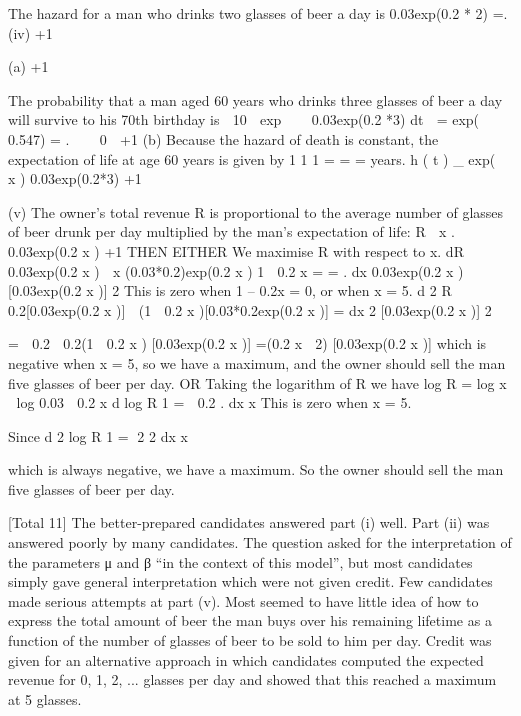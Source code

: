 \documentclass[a4paper,12pt]{article}
\begin{document}
The hazard for a man who drinks two glasses of beer a day is
0.03exp(0.2 * 2) \;=.
(iv)
+1

(a)
+1

The probability that a man aged 60 years who drinks three glasses of
beer a day will survive to his 70th birthday is
 10

exp    0.03exp(0.2 *3) dt  \;=\; exp(  0.547) \;= .


 0

+1
(b)
Because the hazard of death is constant, the expectation of life at age
60 years is given by
1
1
1
\;=\;
\;=\;
\;= years.
h ( t ) \mu_ exp(  x ) 0.03exp(0.2*3)
+1

(v)
The owner’s total revenue R is proportional to the average number of glasses
of beer drunk per day multiplied by the man's expectation of life:
R 
x
.
0.03exp(0.2 x )
+1
THEN EITHER
We maximise R with respect to x.
dR 0.03exp(0.2 x )  x (0.03*0.2)exp(0.2 x )
1  0.2 x
\;=\;
\;=\;
.
dx
0.03exp(0.2 x )
[0.03exp(0.2 x )] 2
This is zero when 1 – 0.2x = 0, or when x = 5.
d 2 R  0.2[0.03exp(0.2 x )]  (1  0.2 x )[0.03*0.2exp(0.2 x )]
\;=\;
dx 2
[0.03exp(0.2 x )] 2



\;=\;
 0.2  0.2(1  0.2 x )
[0.03exp(0.2 x )]
\;=(0.2 x  2)
[0.03exp(0.2 x )]
which is negative when x = 5, 
so we have a maximum, 
and the owner should sell the man five glasses of beer per day. 
OR
Taking the logarithm of R we have
log R \;=\; log x  log 0.03  0.2 x
d log R 1
\;=\;  0.2 .
dx
x
This is zero when x = 5.


Since
d 2 log R
1
\;=\; 2
2
dx
x

which is always negative, 
we have a maximum. 
So the owner should sell the man five glasses of beer per day.


[Total 11]
The better-prepared candidates answered part (i) well. Part (ii) was answered
poorly by many candidates. The question asked for the interpretation of the
parameters μ and β “in the context of this model”, but most candidates simply
gave general interpretation which were not given credit. Few candidates
made serious attempts at part (v). Most seemed to have little idea of how to
express the total amount of beer the man buys over his remaining lifetime as
a function of the number of glasses of beer to be sold to him per day. Credit
was given for an alternative approach in which candidates computed the
expected revenue for 0, 1, 2, ... glasses per day and showed that this
reached a maximum at 5 glasses.
\end{document}
